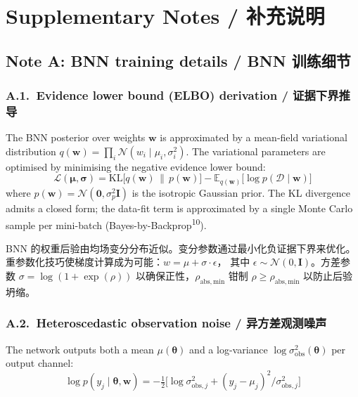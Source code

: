 \documentclass[11pt,a4paper]{article}
\begin{document}
\clearpage

\section{Supplementary Notes / 补充说明}
\label{sec:notes}

\subsection{Note A: BNN training details / BNN 训练细节}

\subsubsection*{A.1.~Evidence lower bound (ELBO) derivation / 证据下界推导}

The BNN posterior over weights $\mathbf{w}$ is approximated by a
mean-field variational distribution
$q(\mathbf{w}) = \prod_i \mathcal{N}(w_i \mid \mu_i, \sigma_i^2)$.
The variational parameters are optimised by minimising the negative
evidence lower bound:
\begin{equation}
\mathcal{L}(\boldsymbol{\mu}, \boldsymbol{\sigma})
= \mathrm{KL}\bigl[q(\mathbf{w}) \,\|\, p(\mathbf{w})\bigr]
- \mathbb{E}_{q(\mathbf{w})}\bigl[\log p(\mathcal{D} \mid \mathbf{w})\bigr]
\end{equation}
where $p(\mathbf{w}) = \mathcal{N}(\mathbf{0}, \sigma_p^2 \mathbf{I})$
is the isotropic Gaussian prior. The KL divergence admits a closed form;
the data-fit term is approximated by a single Monte Carlo sample per
mini-batch (Bayes-by-Backprop\textsuperscript{10}).

BNN 的权重后验由均场变分分布近似。变分参数通过最小化负证据下界来优化。
重参数化技巧使梯度计算成为可能：$w = \mu + \sigma \cdot \epsilon$，
其中 $\epsilon \sim \mathcal{N}(0, \mathbf{I})$。方差参数
$\sigma = \log(1 + \exp(\rho))$ 以确保正性，$\rho_\mathrm{abs,min}$
钳制 $\rho \geq \rho_\mathrm{abs,min}$ 以防止后验坍缩。

\subsubsection*{A.2.~Heteroscedastic observation noise / 异方差观测噪声}

The network outputs both a mean $\mu(\boldsymbol{\theta})$ and a
log-variance $\log \sigma^2_\mathrm{obs}(\boldsymbol{\theta})$ per
output channel:
\begin{equation}
\log p(y_j \mid \boldsymbol{\theta}, \mathbf{w})
= -\tfrac{1}{2}\bigl[\log \sigma^2_{\mathrm{obs},j}
+ (y_j - \mu_j)^2 / \sigma^2_{\mathrm{obs},j}\bigr]
\end{equation}
\end{document}
